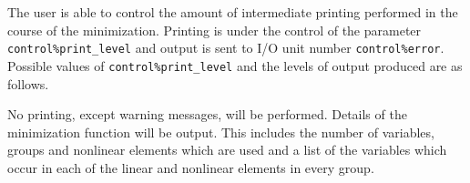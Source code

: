 \documentclass{galahad}
\begin{document}

\galinfo
The user is able to control the amount of intermediate printing
performed in the course of the minimization. Printing is under
the control of the parameter {\tt control\%print\_level} and output is sent to
I/O unit number {\tt control\%error}.
Possible values of {\tt control\%print\_level} and the levels of output
produced are as follows.
\begin{description}
 No printing, except warning messages,
   will be performed.
 Details of the minimization function
                 will be output.
                  This includes the number of variables,
                  groups and
                  nonlinear elements which are used and a list of the
                  variables which occur in each
                  of the linear and nonlinear elements in every group.


\end{description}
\end{document}
